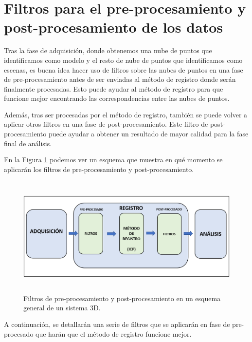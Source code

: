 \section{Filtros para el pre-procesamiento y post-procesamiento de los datos}

Tras la fase de adquisición, donde obtenemos una nube de puntos que identificamos como modelo y el resto de nube de puntos que identificamos como escenas, es buena idea hacer uso de filtros sobre las nubes de puntos en una fase de pre-procesamiento antes de ser enviadas al método de registro donde serán finalmente procesadas.
Esto puede ayudar al método de registro para que funcione mejor encontrando las correspondencias entre las nubes de puntos.

Además, tras ser procesadas por el método de registro, también se puede volver a aplicar otros filtros en una fase de post-procesamiento. Este filtro de post-procesamiento puede ayudar a obtener un resultado de mayor calidad para la fase final de análisis.

En la Figura \ref{fig:diagrama-filtros-pre-post-procesamiento} podemos ver un esquema que muestra en qué momento se aplicarán los filtros de pre-procesamiento y post-procesamiento.

\begin{figure}[h]
    \centering
    \includegraphics[height=6cm]{archivos/diagrama-filtros-pre-post-procesamiento.png}
    \caption{Filtros de pre-procesamiento y post-procesamiento en un esquema general de un sistema 3D.}
    \label{fig:diagrama-filtros-pre-post-procesamiento}
\end{figure}

A continuación, se detallarán una serie de filtros que se aplicarán en fase de pre-procesado que harán que el método de registro funcione mejor.

